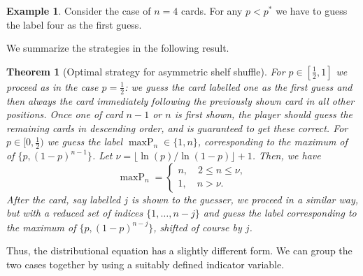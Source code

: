 \documentclass[10pt,reqno,a4paper]{amsart}
\newtheorem{theorem}{Theorem}
\theoremstyle{definition}
\newtheorem{example}{Example}
\DeclareMathOperator{\maxP}{maxP}
\begin{document}
\begin{example}
Consider the case of $n=4$ cards. For any $p<p^{\ast}$ we have to guess the label four as the first guess.
\end{example}
We summarize the strategies in the following result.
\begin{theorem}[Optimal strategy for asymmetric shelf shuffle]
For $p\in[\frac12,1]$ we proceed as in the case $p=\frac12$:  we guess the card labelled one as the first guess and then always the card immediately following the previously shown card in all other positions. Once one of card $n-1$ or $n$ is first shown, the player should guess the remaining cards in descending order, and is guaranteed to get these correct.
For $p\in [0,\frac12)$ we guess the label $\maxP_n\in\{1,n\}$, corresponding to the maximum of of $\{p,(1-p)^{n-1}\}$. 
Let $\nu=\lfloor \ln(p)/\ln(1-p)\rfloor+1$. Then, we have 
\[
\maxP_n=
\begin{cases}
n,\quad 2\le n\le \nu,\\
1,\quad n>\nu.
\end{cases}
\]
After the card, say labelled $j$ is shown to the guesser, we proceed in a similar way, but with a reduced set of indices $\{1,\dots,n-j\}$ and guess the label corresponding to the maximum of $\{p,(1-p)^{n-j}\}$, shifted of course by $j$.
\end{theorem}
Thus, the distributional equation has a slightly different form. We can group the two cases together by using a suitably defined indicator variable. 
\end{document}
